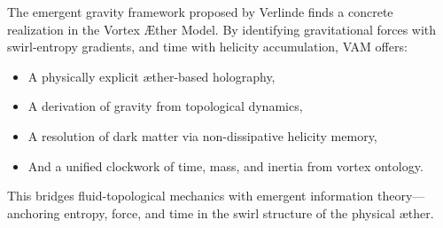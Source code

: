 The emergent gravity framework proposed by Verlinde finds a concrete realization in the Vortex \AE{}ther Model. By identifying gravitational forces with swirl-entropy gradients, and time with helicity accumulation, VAM offers:

\begin{itemize}
    \item A physically explicit æther-based holography,
    \item A derivation of gravity from topological dynamics,
    \item A resolution of dark matter via non-dissipative helicity memory,
    \item And a unified clockwork of time, mass, and inertia from vortex ontology.
\end{itemize}

This bridges fluid-topological mechanics with emergent information theory—anchoring entropy, force, and time in the swirl structure of the physical æther.
